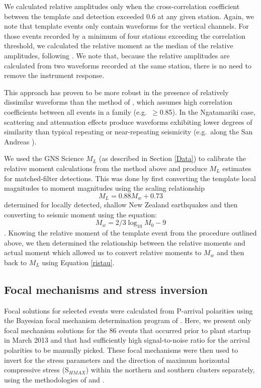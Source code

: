 We calculated relative amplitudes only when the cross-correlation coefficient between the template and detection exceeded 0.6 at any given station. Again, we note that template events only contain waveforms for the vertical channels. For those events recorded by a minimum of four stations exceeding the correlation threshold, we calculated the relative moment as the median of the relative amplitudes, following \citet{Shelly_2016}. We note that, because the relative amplitudes are calculated from two waveforms recorded at the same station, there is no need to remove the instrument response.

This approach has proven to be more robust in the presence of relatively dissimilar waveforms than the method of \citet{Rubinstein_2010}, which assumes high correlation coefficients between all events in a family (e.g.\ $\geq$0.85). In the Ngatamariki case, scattering and attenuation effects produce waveforms exhibiting lower degrees of similarity than typical repeating or near-repeating seismicity (e.g.\ along the San Andreas \citep{Rubinstein_2010}).

We used the GNS Science $M_{L}$ (as described in Section \ref{Data}) to calibrate the relative moment calculations from the method above and produce $M_{L}$ estimates for matched-filter detections. This was done by first converting the template local magnitudes to moment magnitudes using the scaling relationship
\begin{equation}\label{ristau}
M_{L} = 0.88M_{w} + 0.73
\end{equation}
determined for locally detected, shallow New Zealand earthquakes \citep{Ristau_2009} and then converting to seismic moment using the equation:
\begin{equation}
M_w = 2/3\log_{10}M_{0} - 9
\end{equation}
\citep{Hanks_1979}. Knowing the relative moment of the template event from the procedure outlined above, we then determined the relationship between the relative moments and actual moment which allowed us to convert relative moments to $M_w$ and then back to $M_L$ using Equation \ref{ristau}.

\subsection{Focal mechanisms and stress inversion}
Focal solutions for selected events were calculated from P-arrival polarities using the Bayesian focal mechanism determination program of \citet{Walsh_2009}. Here, we present only focal mechanism solutions for the 86 events that occurred prior to plant startup in March 2013 and that had sufficiently high signal-to-noise ratio for the arrival polarities to be manually picked. These focal mechanisms were then used to invert for the stress parameters and the direction of maximum horizontal compressive stress (S$_{HMAX}$) within the northern and southern clusters separately, using the methodologies of \citet{Arnold_2007} and \citet{Lund_2007}.

